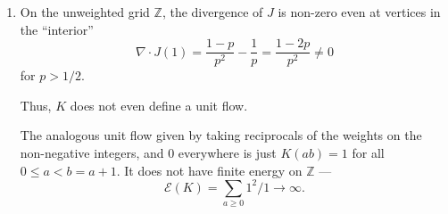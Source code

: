 \documentclass[12 pt, letterpaper]{hmcpset}
\begin{document}
\begin{solution}
\begin{enumerate}
		\item On the unweighted grid $\mathbb{Z}$, the divergence of $J$ is non-zero even at vertices in the ``interior''
			\[
				\nabla \cdot J(1) = \frac{1 - p}{p^{2}} - \frac{1}{p} = \frac{1 - 2p}{p^{2}} \neq 0
			\]
			for $p > 1/2$.

			Thus, $K$ does not even define a unit flow.

			The analogous unit flow given by taking reciprocals of the weights on the non-negative integers, and $0$ everywhere is just $K(ab) = 1$ for all $0 \le a < b = a + 1$. It does not have finite energy on $\mathbb{Z}$ ---
			\[
				\mathcal{E}(K) = \sum_{a \ge 0} 1^{2} / 1 \to \infty.
			\]
	\end{enumerate}
\end{solution}
\end{document}
